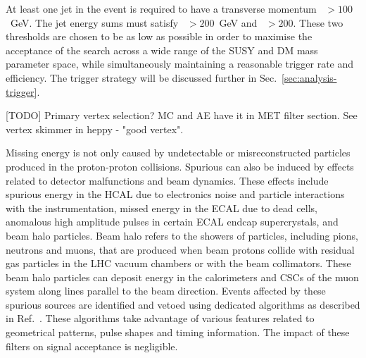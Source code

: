At least one jet in the event is required to have a transverse momentum 
{\pt~$>100$~GeV}. The jet energy sums must satisfy {\scalht~$>200$~GeV} and 
{\mht~$>200$}. 
These two thresholds are chosen to be as low as possible in order to maximise 
the acceptance of the search across a wide range of the SUSY and DM mass 
parameter space, while simultaneously maintaining a reasonable trigger rate and 
efficiency. The trigger strategy will be discussed further in 
Sec.~\ref{sec:analysis-trigger}.

[TODO] Primary vertex selection? MC and AE have it in MET filter section. See 
vertex skimmer in heppy - "good vertex".

Missing energy is not only caused by undetectable or misreconstructed particles 
produced in the proton-proton collisions. Spurious \met can also be induced by 
effects related to detector malfunctions and beam dynamics. These effects 
include spurious energy in the HCAL due to electronics noise and particle 
interactions with the instrumentation, missed energy in the ECAL due to dead 
cells, anomalous high amplitude pulses in certain ECAL endcap supercrystals, 
and beam halo particles. Beam halo refers to the showers of particles, 
including pions, neutrons and muons, that are produced when beam protons 
collide with residual gas particles in the LHC vacuum chambers or with the beam 
collimators. These beam halo particles can deposit energy in the calorimeters 
and CSCs of the muon system along lines parallel to the beam direction.
Events affected by these spurious \met sources are identified and vetoed using 
dedicated algorithms as described in Ref.~\cite{met-filters-16}. These 
algorithms take advantage of various features related to geometrical patterns, 
pulse shapes and timing information. The impact of these filters on signal 
acceptance is negligible.

